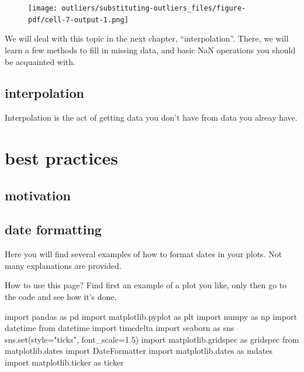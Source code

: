 \documentclass[
  letterpaper,
  DIV=11,
  numbers=noendperiod,
  oneside]{scrreprt}
\newenvironment{Shaded}{\begin{snugshade}}{\end{snugshade}}
\newcommand{\BuiltInTok}[1]{\textcolor[rgb]{0.00,0.23,0.31}{#1}}
\newcommand{\FloatTok}[1]{\textcolor[rgb]{0.68,0.00,0.00}{#1}}
\newcommand{\ImportTok}[1]{\textcolor[rgb]{0.00,0.46,0.62}{#1}}
\newcommand{\NormalTok}[1]{\textcolor[rgb]{0.00,0.23,0.31}{#1}}
\newcommand{\OperatorTok}[1]{\textcolor[rgb]{0.37,0.37,0.37}{#1}}
\newcommand{\StringTok}[1]{\textcolor[rgb]{0.13,0.47,0.30}{#1}}
\begin{document}
\begin{figure}[H]

{\centering \texttt{[image: outliers/substituting-outliers\_files/figure-pdf/cell-7-output-1.png]}

}

\end{figure}

We will deal with this topic in the next chapter, ``interpolation''.
There, we will learn a few methods to fill in missing data, and basic
NaN operations you should be acquainted with.

\hypertarget{interpolation-2}{%
\chapter{interpolation}\label{interpolation-2}}

Interpolation is the act of getting data you don't have from data you
alreay have.

\part{best practices}

\hypertarget{motivation-3}{%
\chapter{motivation}\label{motivation-3}}

\hypertarget{date-formatting}{%
\chapter{date formatting}\label{date-formatting}}

Here you will find several examples of how to format dates in your
plots. Not many explanations are provided.

How to use this page? Find first an example of a plot you like, only
then go to the code and see how it's done.

\begin{Shaded}
\begin{Highlighting}[]
\ImportTok{import}\NormalTok{ pandas }\ImportTok{as}\NormalTok{ pd}
\ImportTok{import}\NormalTok{ matplotlib.pyplot }\ImportTok{as}\NormalTok{ plt}
\ImportTok{import}\NormalTok{ numpy }\ImportTok{as}\NormalTok{ np}
\ImportTok{import}\NormalTok{ datetime}
\ImportTok{from}\NormalTok{ datetime }\ImportTok{import}\NormalTok{ timedelta}
\ImportTok{import}\NormalTok{ seaborn }\ImportTok{as}\NormalTok{ sns}
\NormalTok{sns.}\BuiltInTok{set}\NormalTok{(style}\OperatorTok{=}\StringTok{"ticks"}\NormalTok{, font\_scale}\OperatorTok{=}\FloatTok{1.5}\NormalTok{)}
\ImportTok{import}\NormalTok{ matplotlib.gridspec }\ImportTok{as}\NormalTok{ gridspec}
\ImportTok{from}\NormalTok{ matplotlib.dates }\ImportTok{import}\NormalTok{ DateFormatter}
\ImportTok{import}\NormalTok{ matplotlib.dates }\ImportTok{as}\NormalTok{ mdates}
\ImportTok{import}\NormalTok{ matplotlib.ticker }\ImportTok{as}\NormalTok{ ticker}
\end{Highlighting}
\end{Shaded}
\end{document}
